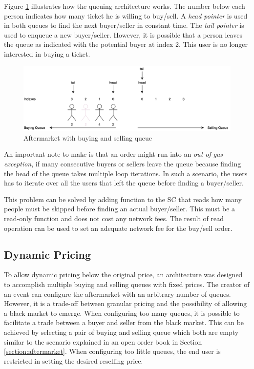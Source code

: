 Figure \ref{fig:aftermarket-queue} illustrates how the queuing architecture works. The number below each person indicates how many ticket he is willing to buy/sell. A \textit{head pointer} is used in both queues to find the next buyer/seller in constant time. The \textit{tail pointer} is used to enqueue a new buyer/seller. However, it is possible that a person leaves the queue as indicated with the potential buyer at index 2. This user is no longer interested in buying a ticket.

\begin{figure}[H]
    \centering
    \includegraphics[width=16cm]{figures/aftermarket-queue.png}
    \caption{Aftermarket with buying and selling queue}
    \label{fig:aftermarket-queue}
\end{figure}

An important note to make is that an order might run into an \textit{out-of-gas exception}, if many consecutive buyers or sellers leave the queue because finding the head of the queue takes multiple loop iterations. In such a scenario, the users has to iterate over all the users that left the queue before finding a buyer/seller. 

This problem can be solved by adding function to the SC that reads how many people must be skipped before finding an actual buyer/seller. This must be a read-only function and does not cost any network fees. The result of read operation can be used to set an adequate network fee for the buy/sell order. 

\subsection{Dynamic Pricing}
To allow dynamic pricing below the original price, an architecture was designed to accomplish multiple buying and selling queues with fixed prices. The creator of an event can configure the aftermarket with an arbitrary number of queues. However, it is a trade-off between granular pricing and the possibility of allowing a black market to emerge. When configuring too many queues, it is possible to facilitate a trade between a buyer and seller from the black market. This can be achieved by selecting a pair of buying and selling queue which both are empty similar to the scenario explained in an open order book in Section \ref{section:aftermarket}. When configuring too little queues, the end user is restricted in setting the desired reselling price. 

